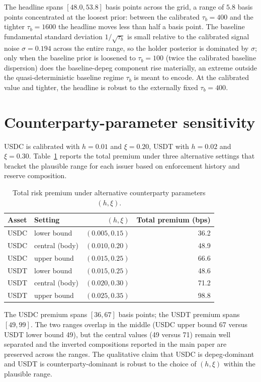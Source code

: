 The headline spans $[48.0, 53.8]$ basis points across the grid, a range of $5.8$ basis points concentrated at the loosest prior: between the calibrated $\tau_b = 400$ and the tighter $\tau_b = 1600$ the headline moves less than half a basis point. The baseline fundamental standard deviation $1/\sqrt{\tau_b}$ is small relative to the calibrated signal noise $\sigma = 0.194$ across the entire range, so the holder posterior is dominated by $\sigma$; only when the baseline prior is loosened to $\tau_b = 100$ (twice the calibrated baseline dispersion) does the baseline-depeg component rise materially, an extreme outside the quasi-deterministic baseline regime $\tau_b$ is meant to encode. At the calibrated value and tighter, the headline is robust to the externally fixed $\tau_b = 400$.

\section{Counterparty-parameter sensitivity}\label{sub:sens_counterparty}

USDC is calibrated with $h = 0.01$ and $\xi = 0.20$, USDT with $h = 0.02$ and $\xi = 0.30$. Table~\ref{tab:sens_counterparty} reports the total premium under three alternative settings that bracket the plausible range for each issuer based on enforcement history and reserve composition.

\begin{table}[H]
\centering
\caption{Total risk premium under alternative counterparty parameters $(h, \xi)$.}\label{tab:sens_counterparty}
\begin{tabular}{llrr}
\toprule
Asset & Setting & $(h, \xi)$ & Total premium (bps) \\
\midrule
USDC & lower bound       & $(0.005, 0.15)$ & 36.2 \\
USDC & central (body)    & $(0.010, 0.20)$ & 48.9 \\
USDC & upper bound       & $(0.015, 0.25)$ & 66.6 \\
\midrule
USDT & lower bound       & $(0.015, 0.25)$ & 48.6 \\
USDT & central (body)    & $(0.020, 0.30)$ & 71.2 \\
USDT & upper bound       & $(0.025, 0.35)$ & 98.8 \\
\bottomrule
\end{tabular}
\end{table}

The USDC premium spans $[36, 67]$ basis points; the USDT premium spans $[49, 99]$. The two ranges overlap in the middle (USDC upper bound 67 versus USDT lower bound 49), but the central values (49 versus 71) remain well separated and the inverted compositions reported in the main paper are preserved across the ranges. The qualitative claim that USDC is depeg-dominant and USDT is counterparty-dominant is robust to the choice of $(h, \xi)$ within the plausible range.

